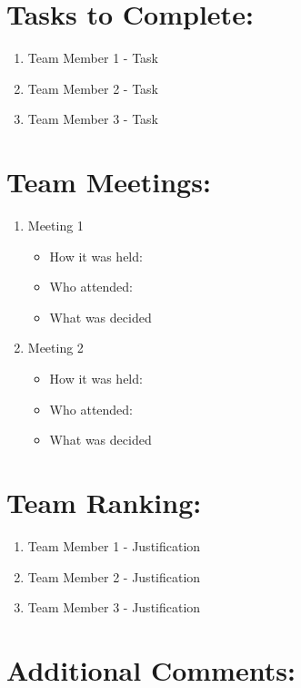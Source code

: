 \documentclass{article}
\begin{document}
\section{Tasks to Complete:}
\begin{enumerate}
  \item Team Member 1 - Task
  \item Team Member 2 - Task
  \item Team Member 3 - Task
\end{enumerate}

\section{Team Meetings:}
\begin{enumerate}
  \item Meeting 1
    \begin{itemize}
        \item How it was held:
        \item Who attended:
        \item What was decided
    \end{itemize}
  \item Meeting 2
    \begin{itemize}
        \item How it was held:
        \item Who attended:
        \item What was decided
    \end{itemize}
\end{enumerate}

\section{Team Ranking:}
\begin{enumerate}
  \item Team Member 1 - Justification
  \item Team Member 2 - Justification
  \item Team Member 3 - Justification
\end{enumerate}


\section{Additional Comments:}






\end{document}

